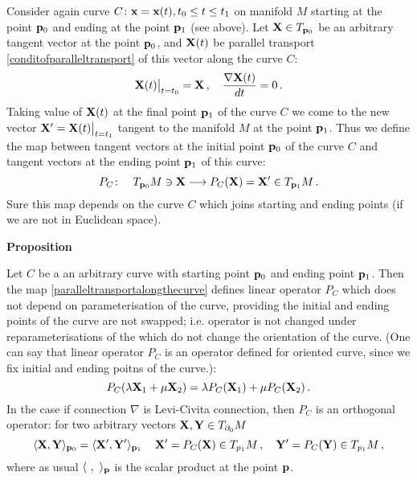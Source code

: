 \documentclass[12pt]{article}
\theoremstyle{theorem}
\numberwithin{equation}{section}
\begin{document}
{Consider again curve $C\colon {\bf x}={\bf x}(t), t_0\leq t\leq t_1 $ 
on manifold $M$ starting at the point
${\bf p}_0$ and ending at the point ${\bf p}_1$ (see above).
Let ${\bf X}\in T_{{\bf p}_0}$ be an arbitrary tangent 
vector at the point ${\bf p}_0$,
and ${\bf X}(t)$ be parallel transport 
\eqref{conditofparalleltransport} of this vector 
along the curve $C$:
              $$
  {\bf X}(t)\big\vert_{t=t_0}={\bf X}\,,\quad {\nabla {\bf X}(t)\over dt}=0\,.
              $$ 
 Taking value of ${\bf X}(t)$ at the final point ${\bf p}_1$ of the curve $C$
we come to the new vector ${\bf X}'={\bf X}(t)\big\vert_{t=t_1}$
tangent to the manifold $M$ at the point ${\bf p}_1$. Thus we define
the map between tangent vectors 
at the initial point ${\bf p}_0$ of the curve $C$ 
and tangent vectors at the ending
point ${\bf p}_1$ of this curve:
  \begin{equation}\label{paralleltransportalongthecurve}
 P_{C}\colon \quad   T_{{\bf p}_0}M \ni{\bf X}
   \longrightarrow P_C({\bf X})={\bf X}' \in T_{{\bf p}_1}M\,.
               \end{equation}
Sure this map depends on the curve $C$
which joins starting and ending points
(if we are not in Euclidean space).


\m

{\bf Proposition}  

  Let $C$ be a an arbitrary curve with starting point ${\bf p}_0$
and ending point  ${\bf p}_1$. Then the map 
\eqref{paralleltransportalongthecurve} defines
 linear operator $P_C$ which does not depend on parameterisation
of the curve, providing the initial and ending 
points of the curve are not swapped; i.e.
 operator is not changed under reparameterisations of the
which do not change the orientation of the curve.
(One can say that linear operator $P_C$ is an operator
defined for oriented curve, since we fix initial and ending poitns
of the curve.):
         \begin{equation}
\label{parallelransportlienaroperator} 
         P_C(\lambda{\bf X}_1+\mu{\bf X}_2)=\lambda P_C({\bf X}_1)+\mu P_C({\bf X}_2)\,. 
         \end{equation}
In the case if connection $\nabla$ is Levi-Civita connection,
then $P_C$ is an orthogonal operator:
 for two arbitrary vectors ${\bf X},{\bf Y}\in T_{\partial_0}M$
   \begin{equation}\label{paralleltransportorthogonaloperator} 
      \langle{\bf X},{\bf Y}\rangle_{{\bf p}_0}=
      \langle {\bf X}',{\bf Y}'\rangle_{{\bf p}_1}\,\quad {\bf X}'=P_C({\bf X})\in T_{p_1}M\,,
                                      \quad {\bf Y}'=P_C({\bf Y})\in T_{p_1}M\,,
         \end{equation}
where as usual
$\langle\,\,,\,\,\rangle_{{\bf p}}$ is the scalar product at the point ${\bf p}$.

}
\end{document}
